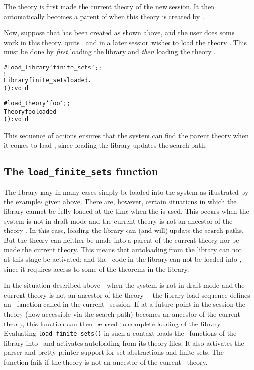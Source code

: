 \noindent The theory  is first made the current theory of the
new session.  It then automatically becomes a parent of  when this
theory is created by .

Now, suppose that  has been created as shown above, and the user does
some work in this theory, quits \HOL, and in a later session wishes to load the
theory .  This must be done by {\it first\/} loading the
 library and {\it then\/} loading the theory .

\setcounter{sessioncount}{1}
\begin{session}\begin{alltt}
#load_library `finite_sets`;;
  \(\vdots\)
Library finite_sets loaded.
() : void

#load_theory `foo`;;
Theory foo loaded
() : void
\end{alltt}\end{session}

\noindent This sequence of actions ensures that the system can find the parent
theory  when it comes to load , since loading the
library updates the search path.

\subsection{The {\tt load\_finite\_sets} function}%

The  library may in many cases simply be loaded into the
system as illustrated by the examples given above.  There are, however, certain
situations in which the library cannot be fully loaded at the time when the
 is used.  This occurs when the system is not in draft mode
and the current theory is not an ancestor of the theory .  In
this case, loading the library can (and will) update the search paths.  But the
theory  can neither be made into a parent of the current
theory nor be made the current theory.  This means that autoloading from the
library can not at this stage be activated; and the \ML\ code in the library
can not be loaded into \HOL, since it requires access to some of the theorems
in the library.

In the situation described above---when the system is not in draft mode and the
current theory is not an ancestor of the theory ---the library
load sequence defines an \ML\ function called  in the
current \HOL\ session.  If at a future point in the session the
 theory (now accessible via the search path) becomes an
ancestor of the current theory, this function can then be used to complete
loading of the library.  Evaluating {\small\verb!load_finite_sets()!} in such a
context loads the \ML\ functions of the  library into \HOL\
and activates autoloading from its theory files.  It also activates the parser
and pretty-printer support for set abstractions and finite sets.  The function
\ml{load\_finite\_sets} fails if the theory \ml{finite\_sets} is not an
ancestor of the current \HOL\ theory.

